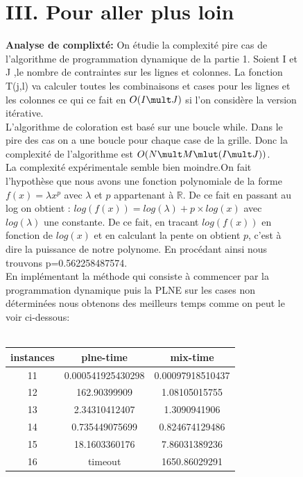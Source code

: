 \documentclass[a4paper]{memoir}
\begin{document}
\begin{figure}[h]
  \section{III. Pour aller plus loin}
  \textbf{Analyse de complixté:} On étudie la complexité pire cas de l'algorithme de programmation dynamique de la partie 1.
  Soient I et J ,le nombre de contraintes sur les lignes et colonnes.
  La fonction T(j,l) va calculer toutes les combinaisons et cases pour les lignes et les colonnes ce qui ce fait en $O(I \mult J)$ si l'on considère la version itérative. \\
  L'algorithme de coloration est basé sur une boucle while.
  Dans le pire des cas on a une boucle pour chaque case de la grille. Donc la complexité de l'algorithme est $O(N\mult M\mlut (I \mult J))$.\\
  La complexité expérimentale semble bien moindre.On fait l'hypothèse que nous avons une fonction polynomiale de la forme $f(x) = \lambda x^p$ avec $\lambda$ et $p$ appartenant à $\mathbb{R}$. De ce fait en passant au log on obtient : $log(f(x)) = log(\lambda) + p \times log(x)$ avec $log(\lambda)$ une constante. De ce fait, en tracant $log(f(x))$ en fonction de $log(x)$ et en calculant la pente on obtient $p$, c'est à dire la puissance de notre polynome.
  En procédant ainsi nous trouvons p=0.562258487574. \\
  
En implémentant la méthode qui consiste à commencer par la programmation dynamique puis la PLNE sur les cases non déterminées nous obtenons des meilleurs temps comme on peut le voir ci-dessous:\\\\
\begin{center}
\begin{tabular}{|c||c||c|}
\hline
instances & plne-time & mix-time \\ 
\hline
11 & 0.000541925430298 & 0.00097918510437 \\ 
\hline
12 & 162.90399909 & 1.08105015755 \\ 
\hline
13 & 2.34310412407 & 1.3090941906 \\ 
\hline
14 & 0.735449075699 & 0.824674129486 \\ 
\hline
15 & 18.1603360176 & 7.86031389236 \\ 
\hline
16 & timeout & 1650.86029291 \\ 
\hline
\end{tabular}
\end{center}


\end{figure}
\end{document}
